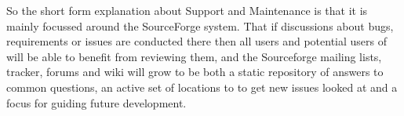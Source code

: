 So the short form explanation about Support and Maintenance is that it is 
mainly focussed around the SourceForge system. That if discussions about 
bugs, requirements or issues are conducted there then all users and potential 
users of {\REDUCE} will be able to benefit from reviewing them, and the 
Sourceforge mailing lists, tracker, forums and wiki will grow to be both a 
static repository of answers to common questions, an active set of locations 
to to get new issues looked at and a focus for guiding future development.


